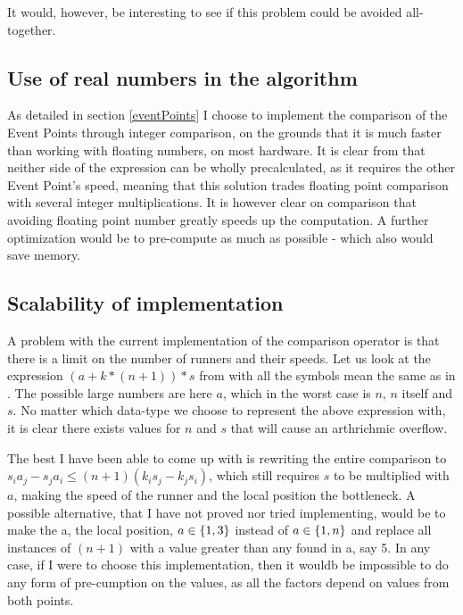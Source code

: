 It would, however, be interesting to see if this problem could be avoided all-together.

\subsection{Use of real numbers in the algorithm}
As detailed in section \ref{eventPoints} I choose to implement the comparison of the Event Points through integer comparison, on the grounds that it is much faster than working with floating numbers, on most hardware. It is clear from  that neither side of the expression can be wholly precalculated, as it requires the other Event Point's speed, meaning that this solution trades floating point comparison with several integer multiplications. It is however clear on comparison that avoiding floating point number greatly speeds up the computation. A further optimization would be to pre-compute as much as possible - which also would save memory.

\subsection{Scalability of implementation}
\label{scale}

A problem with the current implementation of the comparison operator is that there is a limit on the number of runners and their speeds. Let us look at the expression $(a + k * (n+1)) * s$ from  with all the symbols mean the same as in . The possible large numbers are here $a$, which in the worst case is $n$, $n$ itself and $s$. No matter which data-type we choose to represent the above expression with, it is clear there exists values for $n$ and $s$ that will cause an arthrichmic overflow.

The best I have been able to come up with is rewriting the entire comparison to $s_ia_j - s_ja_i \leq (n+1)(k_is_j - k_js_i)$, which still requires $s$ to be multiplied with $a$, making the speed of the runner and the local position the bottleneck. A possible alternative, that I have not proved nor tried implementing, would be to make the a, the local position, $a \in \{1, 3\}$ instead of $a \in \{1, n\}$ and replace all instances of $(n+1)$ with a value greater than any found in a, say 5. In any case, if I were to choose this implementation, then it wouldb be impossible to do any form of pre-cumption on the values, as all the factors depend on values from both points.


